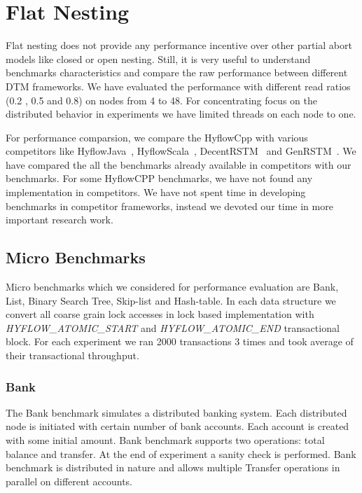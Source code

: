 \documentclass[12pt,english]{report}
\begin{document}
\section{Flat Nesting}

Flat nesting does not provide any performance incentive over other partial abort models like closed or open nesting. Still, it is very useful to understand benchmarks characteristics and compare the raw performance between different DTM frameworks. We have evaluated the performance with different read ratios (0.2 , 0.5 and 0.8) on nodes from 4 to 48. For concentrating focus on the distributed behavior in experiments we have limited threads on each node to one.  

For performance comparsion, we compare the HyflowCpp with various competitors like HyflowJava~\cite{Saad:2011:HHP:1996130.1996167}, HyflowScala~\cite{turcuhyflow2}, DecentRSTM~\cite{DecentSTM:5470446} and GenRSTM~\cite{GenRSTM:6038614}. We have compared the all the benchmarks already available in competitors with our benchmarks. For some HyflowCPP benchmarks, we have not found any implementation in competitors. We have not spent time in developing benchmarks in competitor frameworks, instead we devoted our time in more important research work. 

\subsection{Micro Benchmarks}

Micro benchmarks which we considered for performance evaluation are Bank, List, Binary Search Tree, Skip-list and Hash-table. In each data structure we convert all coarse grain lock accesses in lock based implementation with \emph{HYFLOW{\_}ATOMIC{\_}START} and \emph{HYFLOW{\_}ATOMIC{\_}END} transactional block. For each experiment we ran 2000 transactions 3 times and took average of their transactional throughput.  

\subsubsection{Bank}

The Bank benchmark simulates a distributed banking system. Each distributed node is initiated with certain number of bank accounts. Each account is created with some initial amount. Bank benchmark supports two operations: total balance and transfer. At the end of experiment a sanity check is performed. Bank benchmark is distributed in nature and allows multiple Transfer operations in parallel on different accounts.
\end{document}
